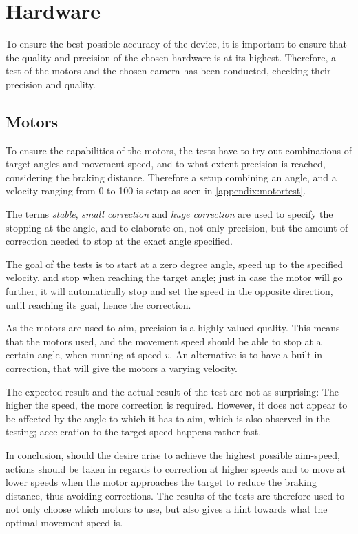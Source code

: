 \section{Hardware}\label{des:sec:hwtest}
To ensure the best possible accuracy of the device, it is important to ensure that the quality and precision of the chosen hardware is at its highest.
Therefore, a test of the motors and the chosen camera has been conducted, checking their precision and quality.

\subsection*{Motors}
To ensure the capabilities of the motors, the tests have to try out combinations of target angles and movement speed, and to what extent precision is reached, considering the braking distance.
Therefore a setup combining an angle, and a velocity ranging from 0 to 100 is setup as seen in \autoref{appendix:motortest}.

The terms \textit{stable}, \textit{small correction} and \textit{huge correction} are used to specify the stopping at the angle, and to elaborate on, not only precision, but the amount of correction needed to stop at the exact angle specified.

The goal of the tests is to start at a zero degree angle, speed up to the specified velocity, and stop when reaching the target angle; just in case the motor will go further, it will automatically stop and set the speed in the opposite direction, until reaching its goal, hence the correction.

As the motors are used to aim, precision is a highly valued quality.
This means that the motors used, and the movement speed should be able to stop at a certain angle, when running at speed $v$.
An alternative is to have a built-in correction, that will give the motors a varying velocity.

The expected result and the actual result of the test are not as surprising: The higher the speed, the more correction is required.
However, it does not appear to be affected by the angle to which it has to aim, which is also observed in the testing; acceleration to the target speed happens rather fast.

In conclusion, should the desire arise to achieve the highest possible aim-speed, actions should be taken in regards to correction at higher speeds and to move at lower speeds when the motor approaches the target to reduce the braking distance, thus avoiding corrections.
The results of the tests are therefore used to not only choose which motors to use, but also gives a hint towards what the optimal movement speed is.

